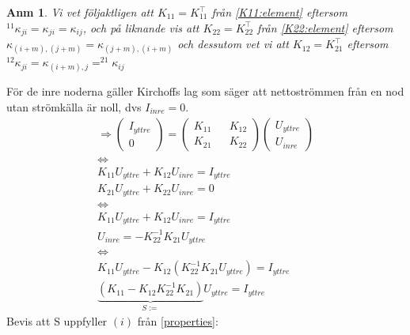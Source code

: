 \documentclass{assignment}
\newtheorem{anm}{Anm}
\begin{document}
\begin{anm}\label{Anm: uppdelningar}
    Vi vet följaktligen att $K_{11}=K_{11}^\top$ från \cref{K11:element} eftersom $^{11}\kappa_{ji}=\kappa_{ji}=\kappa_{ij}$, och på liknande vis att $K_{22}=K_{22}^\top$ från \cref{K22:element} eftersom $\kappa_{(i+m),(j+m)}=\kappa_{(j+m),(i+m)}$ och dessutom vet vi att $K_{12} = K_{21}^\top$ eftersom 
    $^{12}\kappa_{ji} = \kappa_{(i+m),j} = ^{21}\kappa_{ij}$
\end{anm}
För de inre noderna gäller Kirchoffs lag som säger att nettoströmmen från en nod utan strömkälla är noll, dvs $I_{inre}= 0$. 
\begin{align} 
    \Longrightarrow
    \begin{pmatrix}
        I_{yttre}
        \\ 0
    \end{pmatrix}
    = 
    \begin{pmatrix}
        K_{11} && K_{12}
        \\ K_{21} && K_{22}
    \end{pmatrix}
    \begin{pmatrix}
        U_{yttre}
        \\ U_{inre}
    \end{pmatrix}
    \\ \nonumber \Longleftrightarrow
    \\ \nonumber K_{11}U_{yttre} + K_{12}U_{inre} = I_{yttre}
    \\ \nonumber K_{21}U_{yttre} + K_{22}U_{inre} = 0
    \\ \nonumber \Longleftrightarrow
    \\ \nonumber K_{11}U_{yttre} + K_{12}U_{inre} = I_{yttre}
    \\ \nonumber U_{inre} = -K_{22}^{-1}K_{21}U_{yttre}
    \\ \nonumber \Longleftrightarrow
    \\ \nonumber K_{11}U_{yttre} - K_{12}(K_{22}^{-1}K_{21}U_{yttre}) = I_{yttre}
    \\ \underbrace{(K_{11} - K_{12}K_{22}^{-1}K_{21})}_{S:=}U_{yttre} = I_{yttre} \label{An4}
\end{align}
Bevis att S uppfyller $(i)$ från \cref{properties}:
\end{document}
